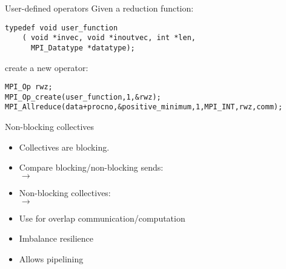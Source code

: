 
\begin{mpitwo}
\begin{numberedframe}[containsverbatim]{User-defined operators}
\lstset{language=C}
Given a reduction function:
\begin{lstlisting}
typedef void user_function
    ( void *invec, void *inoutvec, int *len, 
      MPI_Datatype *datatype); 
\end{lstlisting}  
create a new operator:
\begin{lstlisting}
MPI_Op rwz;
MPI_Op_create(user_function,1,&rwz);
MPI_Allreduce(data+procno,&positive_minimum,1,MPI_INT,rwz,comm);
\end{lstlisting}
\end{numberedframe}

\begin{exerciseframe}[onenorm]
  
\end{exerciseframe}
\end{mpitwo}


\begin{numberedframe}{Non-blocking collectives}
  \label{sl:coll-nonblock-intro}
  \begin{itemize}
  \item Collectives are blocking.
  \item Compare blocking/non-blocking sends:\\
     $\rightarrow$ 
  \item Non-blocking collectives:\\
     $\rightarrow$ 
  \item Use for overlap communication/computation
  \item Imbalance resilience
  \item Allows pipelining
  \end{itemize}
\end{numberedframe}


